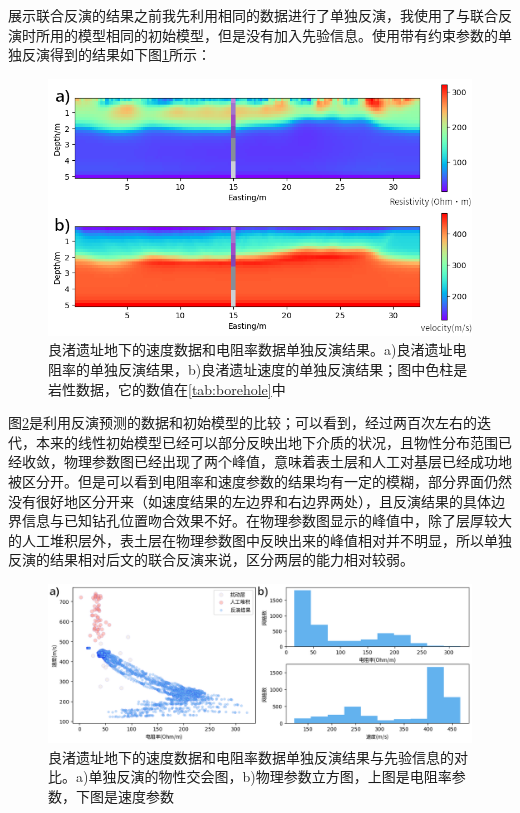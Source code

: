 展示联合反演的结果之前我先利用相同的数据进行了单独反演，我使用了与联合反演时所用的模型相同的初始模型，但是没有加入先验信息。使用带有约束参数的单独反演得到的结果如下图\ref{fig:ind_inv}所示：
\begin{figure}[ht]
    \centering
    \includegraphics[width=\textwidth]{figure/thesis/individual.png}
    \caption{良渚遗址地下的速度数据和电阻率数据单独反演结果。a)良渚遗址电阻率的单独反演结果，b)良渚遗址速度的单独反演结果；图中色柱是岩性数据，它的数值在\ref{tab:borehole}中}
    \label{fig:ind_inv}
\end{figure}

图\ref{fig:ind_compare}是利用反演预测的数据和初始模型的比较；可以看到，经过两百次左右的迭代，本来的线性初始模型已经可以部分反映出地下介质的状况，且物性分布范围已经收敛，物理参数图已经出现了两个峰值，意味着表土层和人工对基层已经成功地被区分开。但是可以看到电阻率和速度参数的结果均有一定的模糊，部分界面仍然没有很好地区分开来（如速度结果的左边界和右边界两处），且反演结果的具体边界信息与已知钻孔位置吻合效果不好。在物理参数图显示的峰值中，除了层厚较大的人工堆积层外，表土层在物理参数图中反映出来的峰值相对并不明显，所以单独反演的结果相对后文的联合反演来说，区分两层的能力相对较弱。

\begin{figure}[ht]
    \centering
    \includegraphics[width=\textwidth]{figure/thesis/res_ind.png}
    \caption{良渚遗址地下的速度数据和电阻率数据单独反演结果与先验信息的对比。a)单独反演的物性交会图，b)物理参数立方图，上图是电阻率参数，下图是速度参数}
    \label{fig:ind_compare}
\end{figure}


